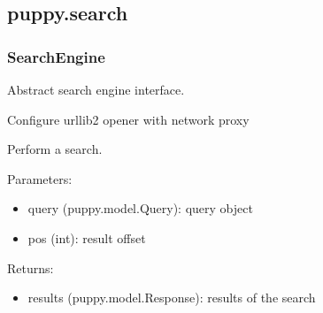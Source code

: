 \documentclass[letterpaper,10pt,english]{sphinxmanual}
\begin{document}
\subsection{puppy.search}
\label{api2.0:module-puppy.search}\label{api2.0:puppy-search}

\subsubsection{SearchEngine}
\label{api2.0:searchengine}

\begin{fulllineitems}
\label{api2.0:puppy.search.SearchEngine}
Abstract search engine interface.

\begin{fulllineitems}
\label{api2.0:puppy.search.SearchEngine.configure_opener}
Configure urllib2 opener with network proxy

\end{fulllineitems}


\begin{fulllineitems}
\label{api2.0:puppy.search.SearchEngine.search}
Perform a search.

Parameters:
\begin{itemize}
\item {} 
query (puppy.model.Query): query object

\item {} 
pos (int): result offset

\end{itemize}

Returns:
\begin{itemize}
\item {} 
results (puppy.model.Response): results of the search

\end{itemize}

\end{fulllineitems}


\end{fulllineitems}
\end{document}
